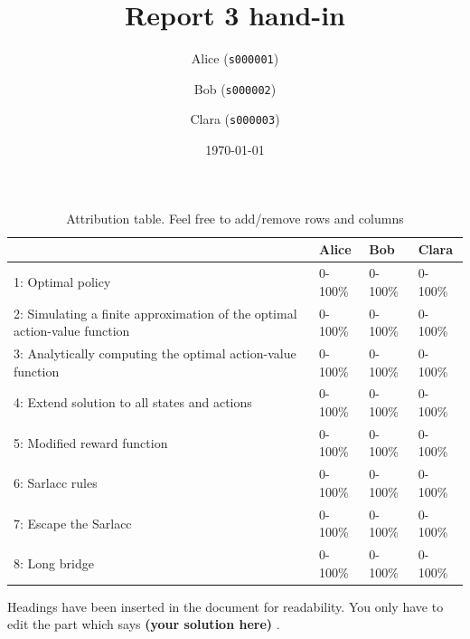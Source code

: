 \documentclass[12pt,twoside]{article}
\title{ Report 3 hand-in }
\date{ \today }
\author{Alice (\texttt{s000001})\and  Bob (\texttt{s000002})\and Clara (\texttt{s000003}) }
\newcommand\redt[1]{ {\textcolor[rgb]{0.60, 0.00, 0.00}{\textbf{ #1} } } }
\newcommand{\yoursolution}{ \redt{(your solution here) } }
\begin{document}
\maketitle

\begin{table}[ht!]
\caption{Attribution table. Feel free to add/remove rows and columns}
\begin{tabular}{llll}
\toprule
                                                                           & Alice   & Bob    & Clara   \\
\midrule
 1: Optimal policy                                                         & 0-100\%  & 0-100\% & 0-100\%  \\
 2: Simulating a finite approximation of the optimal action-value function & 0-100\%  & 0-100\% & 0-100\%  \\
 3: Analytically computing the optimal action-value function               & 0-100\%  & 0-100\% & 0-100\%  \\
 4: Extend solution to all states and actions                              & 0-100\%  & 0-100\% & 0-100\%  \\
 5: Modified reward function                                               & 0-100\%  & 0-100\% & 0-100\%  \\
 6: Sarlacc rules                                                          & 0-100\%  & 0-100\% & 0-100\%  \\
 7: Escape the Sarlacc                                                     & 0-100\%  & 0-100\% & 0-100\%  \\
 8: Long bridge                                                            & 0-100\%  & 0-100\% & 0-100\%  \\
\bottomrule
\end{tabular}
\end{table}


Headings have been inserted in the document for readability. You only have to edit the part which says \yoursolution. 
\end{document}
